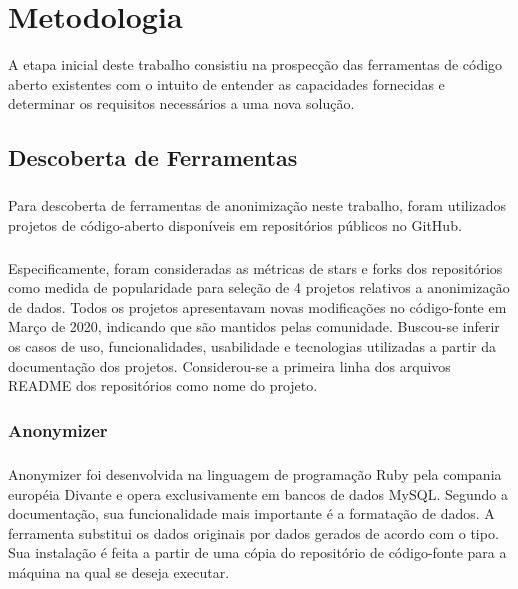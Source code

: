 \chapter{Metodologia}
\label{cap3}

A etapa inicial deste trabalho consistiu na prospecção das ferramentas de código aberto existentes com o intuito de entender
as capacidades fornecidas e determinar os requisitos necessários a uma nova solução.

\section{Descoberta de Ferramentas}

\paragraph{}
Para descoberta de ferramentas de anonimização neste trabalho, foram utilizados projetos de código-aberto disponíveis em repositórios públicos no GitHub. 

\paragraph{}
Especificamente, foram consideradas as métricas de stars e forks dos repositórios como medida de popularidade para seleção de 4 projetos relativos a anonimização de dados. Todos os projetos apresentavam novas modificações no código-fonte em Março de 2020, indicando que são mantidos pelas comunidade. Buscou-se inferir os casos de uso, funcionalidades, usabilidade e tecnologias utilizadas a partir da documentação dos projetos. Considerou-se a primeira linha dos arquivos README dos repositórios como nome do projeto.

\subsection{Anonymizer}

\paragraph{} Anonymizer\cite{Anonymizer} foi desenvolvida na linguagem de programação Ruby pela compania européia Divante e opera exclusivamente em bancos de dados MySQL. Segundo a documentação, sua funcionalidade mais importante é a formatação de dados. A ferramenta substitui os dados originais por dados gerados de acordo com o tipo. Sua instalação é feita a partir de uma cópia do repositório de código-fonte para a máquina na qual se deseja executar.

